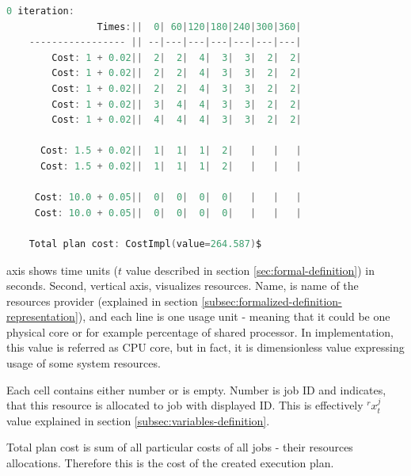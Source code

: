 \noindent
\begin{minipage}{\textwidth}
  \begin{lstlisting}[caption={Simulation data output},label={lst:data-example},language=Kotlin]
    0 iteration:
                Times:||  0| 60|120|180|240|300|360|
    ----------------- || --|---|---|---|---|---|---|
        Cost: 1 + 0.02||  2|  2|  4|  3|  3|  2|  2|
        Cost: 1 + 0.02||  2|  2|  4|  3|  3|  2|  2|
        Cost: 1 + 0.02||  2|  2|  4|  3|  3|  2|  2|
        Cost: 1 + 0.02||  3|  4|  4|  3|  3|  2|  2|
        Cost: 1 + 0.02||  4|  4|  4|  3|  3|  2|  2|

      Cost: 1.5 + 0.02||  1|  1|  1|  2|   |   |   |
      Cost: 1.5 + 0.02||  1|  1|  1|  2|   |   |   |

     Cost: 10.0 + 0.05||  0|  0|  0|  0|   |   |   |
     Cost: 10.0 + 0.05||  0|  0|  0|  0|   |   |   |

    Total plan cost: CostImpl(value=264.587)$
  \end{lstlisting}  
\end{minipage}

\bigskip \noindent
{} axis shows time units ($t$ value described in section \ref{sec:formal-definition}) in seconds.
Second, vertical axis, visualizes resources.
Name,  is name of the resources provider (explained in section \ref{subsec:formalized-definition-representation}),
and each line is one usage unit - meaning that it could be one physical core or for example percentage of shared processor.
In implementation, this value is referred as CPU core,
but in fact, it is dimensionless value expressing usage of some system resources.

Each cell contains either number or is empty.
Number is job ID and indicates, that this resource is allocated to job with displayed ID.
This is effectively $^{r}x_{t}^{j}$ value explained in section \ref{subsec:variables-definition}.

Total plan cost is sum of all particular costs of all jobs - their resources allocations.
Therefore this is the cost of the created execution plan.